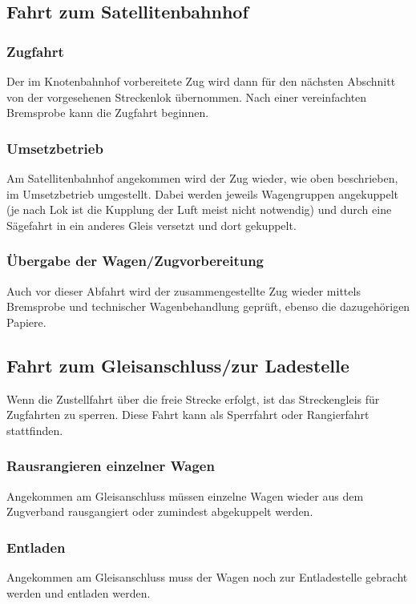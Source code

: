 \subsection{Fahrt zum Satellitenbahnhof}
\subsubsection{Zugfahrt}
Der im Knotenbahnhof vorbereitete Zug wird dann für den nächsten Abschnitt von der vorgesehenen Streckenlok übernommen. Nach einer vereinfachten \gls{Bremsprobe} kann die \gls{Zugfahrt} beginnen.\par
\subsubsection{Umsetzbetrieb}
Am Satellitenbahnhof angekommen wird der Zug wieder, wie oben beschrieben, im Umsetzbetrieb umgestellt. Dabei werden
jeweils Wagengruppen angekuppelt (je nach Lok ist die Kupplung der Luft meist nicht notwendig) und durch eine Sägefahrt in ein anderes Gleis versetzt und dort gekuppelt.
\subsubsection{Übergabe der Wagen/Zugvorbereitung}
Auch  vor  dieser  Abfahrt  wird der  zusammengestellte  Zug wieder mittels \gls{Bremsprobe} und technischer Wagenbehandlung geprüft, ebenso die dazugehörigen Papiere.

\subsection{Fahrt zum Gleisanschluss/zur Ladestelle}
Wenn die Zustellfahrt über die freie Strecke erfolgt, ist das Streckengleis für Zugfahrten zu sperren. Diese Fahrt kann als Sperrfahrt oder Rangierfahrt stattfinden.
\subsubsection{Rausrangieren einzelner Wagen}
Angekommen am \gls{Gleisanschluss} müssen einzelne Wagen wieder aus dem Zugverband rausgangiert oder zumindest abgekuppelt werden.
\subsubsection{Entladen}
Angekommen am \gls{Gleisanschluss} muss der Wagen noch zur Entladestelle gebracht werden und entladen werden.